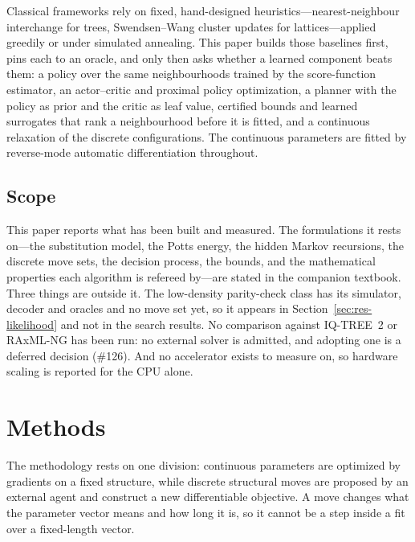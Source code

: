 \documentclass[11pt,a4paper]{article}
\begin{document}
Classical frameworks rely on fixed, hand-designed heuristics---nearest-neighbour
interchange for trees, Swendsen--Wang cluster updates for lattices---applied
greedily or under simulated annealing. This paper builds those baselines
first, pins each to an oracle, and only then asks whether a learned component
beats them: a policy over the same neighbourhoods trained by the
score-function estimator, an actor--critic and proximal policy optimization,
a planner with the policy as prior and the critic as leaf value, certified
bounds and learned surrogates that rank a neighbourhood before it is fitted,
and a continuous relaxation of the discrete configurations. The continuous
parameters are fitted by reverse-mode automatic differentiation throughout.

\subsection{Scope}
This paper reports what has been built and measured. The formulations it rests
on---the substitution model, the Potts energy, the hidden Markov recursions,
the discrete move sets, the decision process, the bounds, and the mathematical
properties each algorithm is refereed by---are stated in the companion
textbook. Three things are outside it. The low-density parity-check class has
its simulator, decoder and oracles and no move set yet, so it appears in
Section~\ref{sec:res-likelihood} and not in the search results. No comparison
against IQ-TREE~2 or RAxML-NG has been run: no external solver is admitted, and
adopting one is a deferred decision (\#126). And no accelerator exists to
measure on, so hardware scaling is reported for the CPU alone.

\section{Methods}
\label{sec:methods}

The methodology rests on one division: continuous parameters are optimized by
gradients on a fixed structure, while discrete structural moves are proposed by
an external agent and construct a new differentiable objective. A move changes
what the parameter vector means and how long it is, so it cannot be a step
inside a fit over a fixed-length vector.
\end{document}
